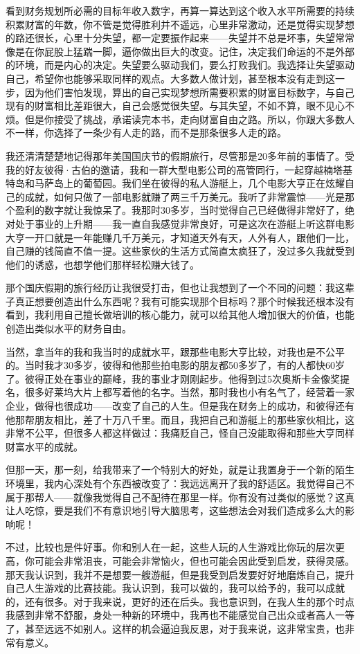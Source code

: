 看到财务规划所必需的目标年收入数字，再算一算达到这个收入水平所需要的持续积累财富的年数，你不管是觉得胜利并不遥远，心里非常激动，还是觉得实现梦想的路还很长，心里十分失望，都一定要振作起来——失望并不总是坏事，失望常常像是在你屁股上猛踹一脚，逼你做出巨大的改变。记住，决定我们命运的不是外部的环境，而是内心的决定。失望要么驱动我们，要么打败我们。我选择让失望驱动自己，希望你也能够采取同样的观点。大多数人做计划，甚至根本没有走到这一步，因为他们害怕发现，算出的自己实现梦想所需要积累的财富目标数字，与自己现有的财富相比差距很大，自己会感觉很失望。与其失望，不如不算，眼不见心不烦。但是你接受了挑战，承诺读完本书，走向财富自由之路。所以，你跟大多数人不一样，你选择了一条少有人走的路，而不是那条很多人走的路。

我还清清楚楚地记得那年美国国庆节的假期旅行，尽管那是20多年前的事情了。受我的好友彼得·古伯的邀请，我和一群大型电影公司的高管同行，一起穿越楠塔基特岛和马萨岛上的葡萄园。我们坐在彼得的私人游艇上，几个电影大亨正在炫耀自己的成就，如何只做了一部电影就赚了两三千万美元。我听了非常震惊——光是那个盈利的数字就让我惊呆了。我那时30多岁，当时觉得自己已经做得非常好了，绝对处于事业的上升期——我一直自我感觉非常良好，可是这次在游艇上听这群电影大亨一开口就是一年能赚几千万美元，才知道天外有天，人外有人，跟他们一比，自己赚的钱简直不值一提。这些家伙的生活方式简直太疯狂了，没过多久我就受到他们的诱惑，也想学他们那样轻松赚大钱了。

那个国庆假期的旅行经历让我很受打击，但也让我想到了一个不同的问题：我这辈子真正想要创造出什么东西呢？我有可能实现那个目标吗？那个时候我还根本没有看到，我利用自己擅长做培训的核心能力，就可以给其他人增加很大的价值，也能创造出类似水平的财务自由。

当然，拿当年的我和我当时的成就水平，跟那些电影大亨比较，对我也是不公平的。当时我才30多岁，彼得和他那些拍电影的朋友都50多岁了，有的人都快60岁了。彼得正处在事业的巅峰，我的事业才刚刚起步。他得到过5次奥斯卡金像奖提名，很多好莱坞大片上都写着他的名字。当然，那时我也小有名气了，经营着一家企业，做得也很成功——改变了自己的人生。但是我在财务上的成功，和彼得还有他那帮朋友相比，差了十万八千里。而且，我把自己和游艇上的那些家伙相比，这非常不公平，但很多人都这样做过：我痛贬自己，怪自己没能取得和那些大亨同样财富水平的成就。

但那一天，那一刻，给我带来了一个特别大的好处，就是让我置身于一个新的陌生环境里，我内心深处有个东西被改变了：我远远离开了我的舒适区。我觉得自己不属于那帮人——就像我觉得自己不配待在那里一样。你有没有过类似的感觉？这真让人吃惊，要是我们不有意识地引导大脑思考，这些想法会对我们造成多么大的影响呢！

不过，比较也是件好事。你和别人在一起，这些人玩的人生游戏比你玩的层次更高，你可能会非常沮丧，可能会非常恼火，但也可能会因此受到启发，获得灵感。那天我认识到，我并不是想要一艘游艇，但是我受到启发要好好地磨炼自己，提升自己人生游戏的比赛技能。我认识到，我可以做的，我可以给予的，我可以成就的，还有很多。对于我来说，更好的还在后头。我也意识到，在我人生的那个时点我感到非常不舒服，身处一种新的环境中，我再也不能感觉自己出众或者高人一等了，甚至远远不如别人。这样的机会逼迫我反思，对于我来说，这非常宝贵，也非常有意义。

